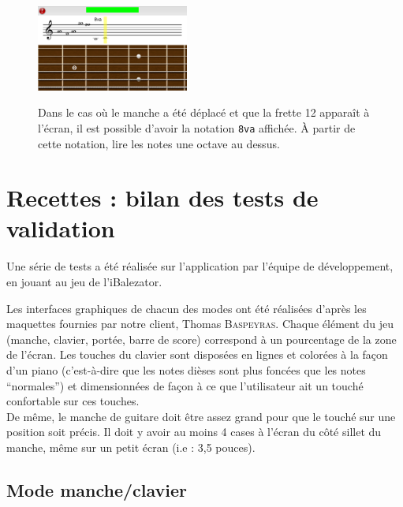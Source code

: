 \documentclass{scrreprt}
\begin{document}
\begin{figure}[!ht]
  \begin{minipage}{6cm}
      \includegraphics[width=5cm]{images/portee_octava.png}
  \end{minipage}\hfill
  \begin{minipage}{10cm}
  {Dans le cas où le manche a été déplacé et que la frette 12 apparaît à l'écran, il est possible d'avoir la notation \texttt{8va} affichée. À partir de cette notation, lire les notes une octave au dessus.}
   \end{minipage}
\end{figure}


\section{Recettes : bilan des tests de validation}

Une série de tests a été réalisée sur l'application par l'équipe de développement, en jouant au jeu de l'iBalezator.\\
\smallbreak

Les interfaces graphiques de chacun des modes ont été réalisées d'après les maquettes fournies par notre client, Thomas \textsc{Baspeyras}. Chaque élément du jeu (manche, clavier, portée, barre de score) correspond à un pourcentage de la zone de l'écran. 
Les touches du clavier sont disposées en lignes et colorées à la façon d'un piano (c'est-à-dire que les notes dièses sont plus foncées que les notes \enquote{normales}) et dimensionnées de façon à ce que l'utilisateur ait un touché confortable sur ces touches. \\
De même, le manche de guitare doit être assez grand pour que le touché sur une position soit précis. Il doit y avoir au moins 4 cases à l'écran du côté sillet du manche, même sur un petit écran (i.e : 3,5 pouces).
\newpage
\subsection{Mode manche/clavier}
\end{document}
